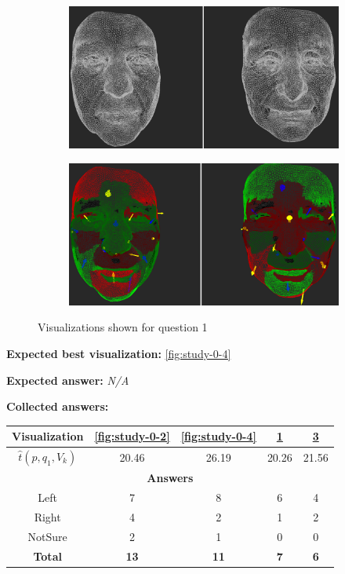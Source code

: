 \begin{figure}[h]
\begin{subfigure}{0.49\textwidth}
\includegraphics[width=\textwidth]{./img-study/pair1.PNG}
\caption{}
\label{fig:study-0-1}
\end{subfigure}
\begin{subfigure}{0.49\textwidth}
\includegraphics[width=\textwidth]{./img-study/pair3.PNG}
\caption{}
\label{fig:study-0-3}
\end{subfigure}
\caption{Visualizations shown for question 1}
\end{figure}
\medskip

{\bf Expected best visualization:} \ref{fig:study-0-4}
\medskip

{\bf Expected answer:} {\it N/A}
\medskip

{\bf Collected answers:}

\begin{center}
\begin{tabular}{| c | c | c | c | c |}
	\hline
	Visualization & \ref{fig:study-0-2} & \ref{fig:study-0-4} & \ref{fig:study-0-1} & \ref{fig:study-0-3}\\ \hline
	\(\widehat{t}(p, q_1, V_k)\) & 20.46 & 26.19 & 20.26 & 21.56\\ \hline
	\multicolumn{5}{|c|}{\bf Answers} \\ \hline
	Left & 7 & 8 & 6 & 4\\ \hline
	Right & 4 & 2 & 1 & 2\\ \hline
	NotSure & 2 & 1 & 0 & 0\\ \hline
	{\bf Total} & {\bf 13} & {\bf 11} & {\bf 7} & {\bf 6}\\ \hline
\end{tabular}
\end{center}

